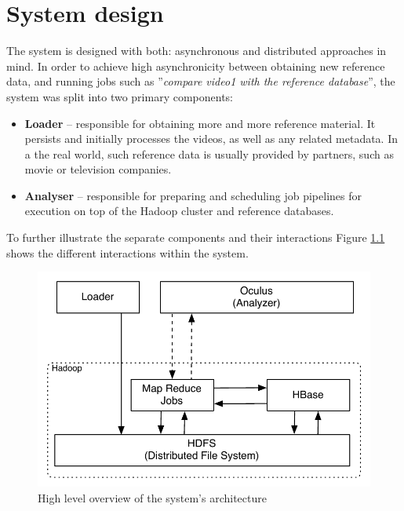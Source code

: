 
\chapter{System design}
\label{chap:system-design}

The system is designed with both: asynchronous and distributed approaches in mind. In order to achieve high asynchronicity between obtaining new reference data, and running jobs such as ''\textit{compare video1 with the reference database}'', the system was split into two primary components: 

\begin{itemize}
  \item \textbf{Loader} -- responsible for obtaining more and more reference material. It persists and initially processes the videos, as well as any related metadata. In a the real world, such reference data is usually provided by partners, such as movie or television companies.
  \item \textbf{Analyser} -- responsible for preparing and scheduling job pipelines for execution on top of the Hadoop cluster and reference databases.
\end{itemize}

To further illustrate the separate components and their interactions Figure \ref{fig:system-overview} shows the different interactions within the system.

\begin{figure}[hc!]
 \centering
  \includegraphics[scale=0.9]{./diagrams/high-level-system.pdf}
  \caption{High level overview of the system's architecture}
  \label{fig:system-overview}
\end{figure}

